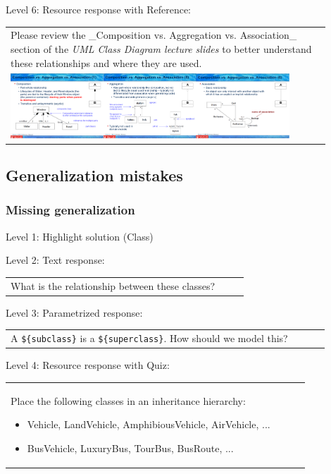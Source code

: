 \noindent Level 6: Resource response with Reference: \medskip

\begin{tabular}{|p{0.9\linewidth}}
Please review the _Composition vs. Aggregation vs. Association_ section of 
the \textit{UML Class Diagram lecture slides} to 
better understand these relationships and where they are used.

\\
\includegraphics[width=0.9\textwidth]{images/composition_aggregation_association.png}
\end{tabular} \medskip


\subsection{Generalization mistakes}

\subsubsection{Missing generalization}

\noindent Level 1: Highlight solution (Class) \medskip

\noindent Level 2: Text response: \medskip

\begin{tabular}{|p{0.9\linewidth}}
What is the relationship between these classes?
\end{tabular} \medskip

\noindent Level 3: Parametrized response: \medskip

\begin{tabular}{|p{0.9\linewidth}}
A \verb|${subclass}| is a \verb|${superclass}|. How should we model this?
\end{tabular} \medskip

\noindent Level 4: Resource response with Quiz: \medskip

\begin{tabular}{|p{0.9\linewidth}}
Place the following classes in an inheritance hierarchy:

\begin{itemize}
    \item Vehicle, LandVehicle, AmphibiousVehicle, AirVehicle, ...
    \item BusVehicle, LuxuryBus, TourBus, BusRoute, ...
\end{itemize}

\end{tabular} \medskip


